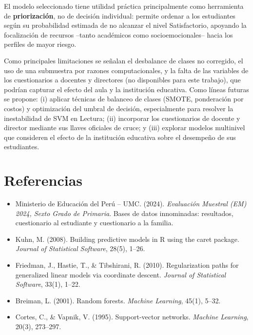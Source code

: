 \documentclass[11pt]{article}
\begin{document}
El modelo seleccionado tiene utilidad práctica principalmente como
herramienta de \textbf{priorización}, no de decisión individual: permite
ordenar a los estudiantes según su probabilidad estimada de no alcanzar
el nivel Satisfactorio, apoyando la focalización de recursos --tanto
académicos como socioemocionales-- hacia los perfiles de mayor riesgo.

Como principales limitaciones se señalan el desbalance de clases no
corregido, el uso de una submuestra por razones computacionales, y la
falta de las variables de los cuestionarios a docentes y directores (no
disponibles para este trabajo), que podrían capturar el efecto del aula
y la institución educativa. Como líneas futuras se propone: (i) aplicar
técnicas de balanceo de clases (SMOTE, ponderación por costos) y
optimización del umbral de decisión, especialmente para resolver la
inestabilidad de SVM en Lectura; (ii) incorporar los cuestionarios de
docente y director mediante sus llaves oficiales de cruce; y (iii)
explorar modelos multinivel que consideren el efecto de la institución
educativa sobre el desempeño de sus estudiantes.

\section*{Referencias}

\begin{itemize}
    \item Ministerio de Educación del Perú -- UMC. (2024). \textit{Evaluación
    Muestral (EM) 2024, Sexto Grado de Primaria}. Bases de datos
    innominadas: resultados, cuestionario al estudiante y cuestionario a
    la familia.
    \item Kuhn, M. (2008). Building predictive models in R using the
    caret package. \textit{Journal of Statistical Software}, 28(5), 1--26.
    \item Friedman, J., Hastie, T., \& Tibshirani, R. (2010).
    Regularization paths for generalized linear models via coordinate
    descent. \textit{Journal of Statistical Software}, 33(1), 1--22.
    \item Breiman, L. (2001). Random forests. \textit{Machine Learning},
    45(1), 5--32.
    \item Cortes, C., \& Vapnik, V. (1995). Support-vector networks.
    \textit{Machine Learning}, 20(3), 273--297.
\end{itemize}
\end{document}
